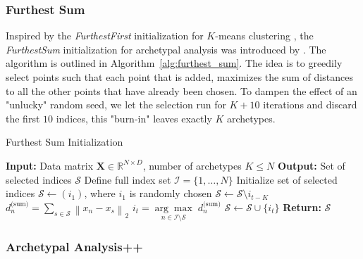 \documentclass[oneside]{article}
\begin{document}
\subsubsection{Furthest Sum}

Inspired by the \textit{FurthestFirst} initialization for $K$-means clustering \autocite{hochbaumBestPossibleHeuristic1985}, the \textit{FurthestSum} initialization for archetypal analysis was introduced by \textcite{morupArchetypalAnalysisMachine2012}. The algorithm is outlined in Algorithm~\ref{alg:furthest_sum}. The idea is to greedily select points such that each point that is added, maximizes the sum of distances to all the other points that have already been chosen. To dampen the effect of an "unlucky" random seed, we let the selection
run for $K+10$ iterations and discard the first $10$ indices, this "burn-in" leaves exactly $K$
archetypes.

\begin{algorithm}[H]
    \caption{Furthest Sum Initialization}
    \label{alg:furthest_sum}
    \begin{algorithmic}[1]
    \State \textbf{Input:} Data matrix $\mathbf{X} \in \mathbb{R}^{N \times D}$, number of archetypes $K \leq N$
    \State \textbf{Output:} Set of selected indices $\mathcal{S}$
    \State Define full index set $\mathcal{I} = \{1, \dots, N\}$
    \State Initialize set of selected indices $\mathcal{S} \gets \left( i_1 \right)$, where $i_1$ is randomly chosen
            \State $\mathcal{S} \gets \mathcal{S} \setminus i_{t-K}$ 
        \EndIf
         
            \State $d_n^{\text{(sum)}} = \sum_{s \in \mathcal{S}} \left\| x_n - x_s \right\|_2$
        \EndFor
    \State $i_t = \underset{n \in \mathcal{I} \setminus \mathcal{S}}{\arg \max} \; d_n^{\text{(sum)}}$ 
    \State $\mathcal{S} \gets \mathcal{S} \cup \{i_t\}$ 
    \EndFor
    \State \textbf{Return:} $\mathcal{S}$
    \end{algorithmic}
\end{algorithm}

\subsubsection{Archetypal Analysis++}
\end{document}
